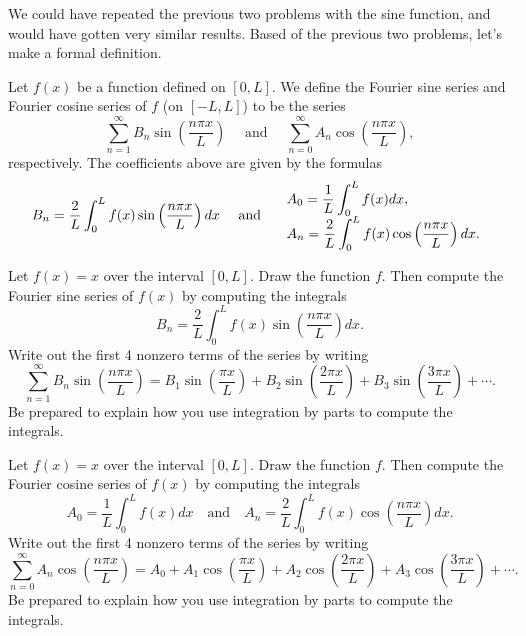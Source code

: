 We could have repeated the previous two problems with the sine function, and would have gotten very similar results.  Based of the previous two problems, let's make a formal definition.

\begin{definition}
 Let $f(x)$ be a function defined on $[0,L]$. We define the Fourier sine series and Fourier cosine series of $f$ (on $[-L,L]$) to be the series
$$\sum_{n=1}^\infty B_n \sin\left(\frac{n\pi x}{L}\right) \quad\text{ and }\quad \sum_{n=0}^\infty A_n \cos\left(\frac{n\pi x}{L}\right),$$
respectively.  The coefficients above are given by the formulas
$$B_n=\frac{2}{L}\int_{0}^L f(x)\sin\left(\frac{n\pi x}{L}\right)dx
\quad\text{ and }\quad 
\begin{array}{l}
\displaystyle A_0=\frac{1}{L}\int_{0}^L f(x)dx,\\
\displaystyle A_n=\frac{2}{L}\int_{0}^L f(x)\cos\left(\frac{n\pi x}{L}\right)dx.
\end{array}$$
\end{definition}


\begin{problem}
 Let $f(x) = x$ over the interval $[0,L]$. Draw the function $f$.  Then compute the Fourier sine series of $f(x)$ by computing the integrals 
$$B_n=\frac{2}{L}\int_{0}^L f(x)\sin\left(\frac{n\pi x}{L}\right)dx.$$
 Write out the first 4 nonzero terms of the series by writing
$$ \sum_{n=1}^\infty B_n \sin\left(\frac{n\pi x}{L}\right) = 
B_1 \sin\left(\frac{\pi x}{L}\right)+
B_2 \sin\left(\frac{2\pi x}{L}\right)+
B_3 \sin\left(\frac{3\pi x}{L}\right)+
\cdots.$$
Be prepared to explain how you use integration by parts to compute the integrals. 
\end{problem}

\begin{problem}
 Let $f(x) = x$ over the interval $[0,L]$. Draw the function $f$.  Then compute the Fourier cosine series of $f(x)$ by computing the integrals 
$$A_0=\frac{1}{L}\int_{0}^L f(x)dx \quad\text{and}\quad A_n=\frac{2}{L}\int_{0}^L f(x)\cos\left(\frac{n\pi x}{L}\right)dx.$$
 Write out the first 4 nonzero terms of the series by writing
$$ \sum_{n=0}^\infty A_n \cos\left(\frac{n\pi x}{L}\right) = 
A_0 +
A_1 \cos\left(\frac{\pi x}{L}\right)+
A_2 \cos\left(\frac{2\pi x}{L}\right)+
A_3 \cos\left(\frac{3\pi x}{L}\right)+
\cdots.$$
Be prepared to explain how you use integration by parts to compute the integrals. 
\end{problem}

